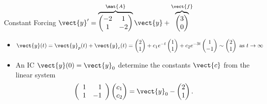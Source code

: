 \begin{frame}{Constant Forcing \qquad $\vect{y}'=\overbrace{\begin{pmatrix}-2&1\\1&-2\end{pmatrix}}^{\mat{A}}\vect{y}+\overbrace{\begin{pmatrix}3\\0\end{pmatrix}}^{\vect{f}}$}
\begin{itemize}
\[    =\begin{pmatrix}2\\1\end{pmatrix}.
  \]
  \item $\displaystyle \vect{y}(t)=\vect{y}_p(t)+\vect{y}_c(t)=\begin{pmatrix}2\\1\end{pmatrix} +c_1e^{-t}\begin{pmatrix}1\\1\end{pmatrix} +c_2e^{-3t}\begin{pmatrix}1\\-1\end{pmatrix} \sim \begin{pmatrix}2\\1\end{pmatrix}\text{ as }t\to\infty$
  \item An IC $\vect{y}(0)=\vect{y}_0$ determine the 
  constants $\vect{c}$ from the linear system
  \[
    \left(\begin{array}{rr}1&1\\1&-1\end{array}\right)
    \begin{pmatrix}c_1\\c_2\end{pmatrix}
    =\vect{y}_0-\begin{pmatrix}2\\1\end{pmatrix}
    .
  \]
\end{itemize}
\end{frame}
